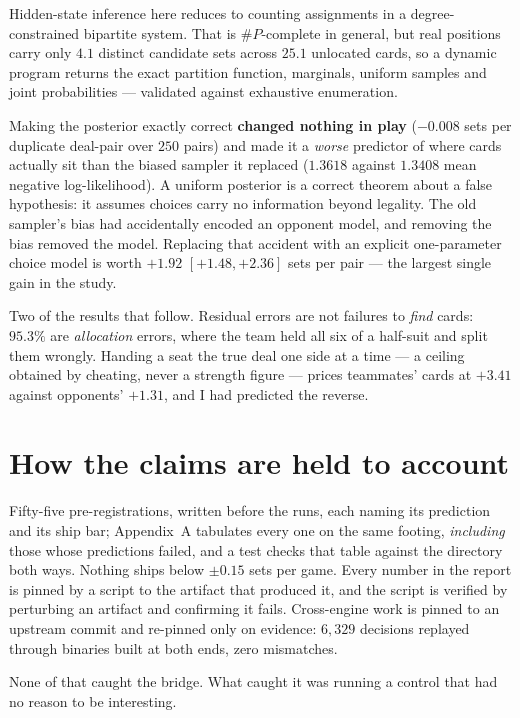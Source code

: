 \documentclass[11pt,a4paper]{article}
\begin{document}
Hidden-state inference here reduces to counting assignments in a
degree-constrained bipartite system. That is $\#P$-complete in general, but
real positions carry only $4.1$ distinct candidate sets across $25.1$ unlocated
cards, so a dynamic program returns the exact partition function, marginals,
uniform samples and joint probabilities --- validated against exhaustive
enumeration.

Making the posterior exactly correct \textbf{changed nothing in play}
($-0.008$ sets per duplicate deal-pair over $250$ pairs) and made it a
\emph{worse} predictor of where cards actually sit than the biased sampler it
replaced ($1.3618$ against $1.3408$ mean negative log-likelihood). A uniform
posterior is a correct theorem about a false hypothesis: it assumes choices
carry no information beyond legality. The old sampler's bias had accidentally
encoded an opponent model, and removing the bias removed the model. Replacing
that accident with an explicit one-parameter choice model is worth $+1.92$
$[+1.48, +2.36]$ sets per pair --- the largest single gain in the study.

Two of the results that follow. Residual errors are not failures to \emph{find} cards:
$95.3\%$ are \emph{allocation} errors, where the team held all six of a
half-suit and split them wrongly. Handing a seat the true deal one side at a
time --- a ceiling obtained by cheating, never a strength figure --- prices
teammates' cards at $+3.41$ against opponents' $+1.31$, and I had predicted the
reverse.

\section{How the claims are held to account}

Fifty-five pre-registrations, written before the runs, each naming its
prediction and its ship bar; Appendix~A tabulates every one on the same
footing, \emph{including} those whose predictions failed, and a test checks
that table against the directory both ways. Nothing ships below $\pm0.15$ sets
per game. Every number in the report is pinned by a script to the artifact
that produced it, and the script is verified by perturbing an artifact and
confirming it fails. Cross-engine work is pinned to
an upstream commit and re-pinned only on evidence: $6{,}329$ decisions replayed
through binaries built at both ends, zero mismatches.

None of that caught the bridge. What caught it was running a control that had
no reason to be interesting.
\end{document}
